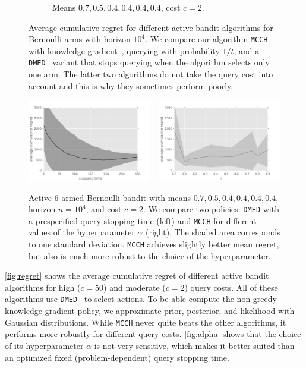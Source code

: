 \documentclass[a4paper]{article}
\begin{document}
\begin{figure}[t]
\begin{subfigure}[b]{0.48\textwidth}
\caption{Means $0.7, 0.5, 0.4, 0.4, 0.4, 0.4$, cost $c = 2$.}
\label{fig:regret2}
\end{subfigure}
\caption{
Average cumulative regret for different active bandit algorithms
for Bernoulli arms with horizon $10^4$.
We compare our algorithm \texttt{MCCH} with
knowledge gradient~\citep[Ch.~5]{PowellRyzhov12},
querying with probability $1/t$, and
a \texttt{DMED}~\citep{Honda10} variant that stops querying when
the algorithm selects only one arm.
The latter two algorithms do not take the query cost into account
and this is why they sometimes perform poorly.
}
\label{fig:regret}
\end{figure}

\begin{figure}[t]
\centering
\includegraphics[width=0.48\textwidth]{query-stop.pdf}%
~
\includegraphics[width=0.48\textwidth]{mcch.pdf}
\caption{Active 6-armed Bernoulli bandit with means
$0.7, 0.5, 0.4, 0.4, 0.4, 0.4$,
horizon $n = 10^4$, and cost $c = 2$.
We compare two policies:
\texttt{DMED} with a prespecified query stopping time (left)
and \texttt{MCCH}
for different values of the hyperparameter $\alpha$ (right).
The shaded area corresponds to one standard deviation.
\texttt{MCCH} achieves slightly better mean regret,
but also is much more robust to the choice of the hyperparameter.
}
\label{fig:alpha}
\end{figure}


\autoref{fig:regret} shows the average cumulative regret
of different active bandit algorithms for high ($c = 50$) and
moderate ($c = 2$) query costs.
All of these algorithms use \texttt{DMED}~\citep{Honda10}
to select actions.
To be able compute the non-greedy knowledge gradient policy,
we approximate prior, posterior, and likelihood with Gaussian distributions.
While \texttt{MCCH} never quite beats the other algorithms,
it performs more robustly for different query costs.
\autoref{fig:alpha} shows that the choice of its hyperparameter $\alpha$
is not very sensitive,
which makes it better suited than
an optimized fixed (problem-dependent) query stopping time.
\end{document}
